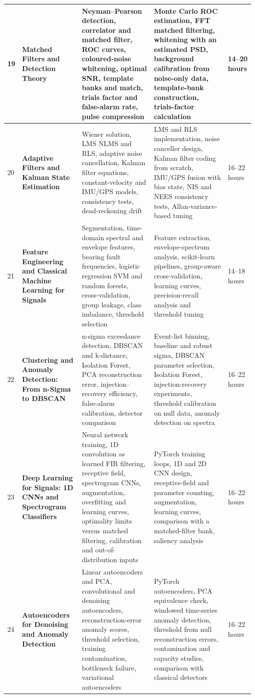 \documentclass[11pt,a4paper,landscape]{article}
\begin{document}
{\begin{longtable}{@{}p{0.6cm}p{3.7cm}p{8.2cm}p{7.6cm}p{2.0cm}@{}}
19 & \textbf{Matched Filters and Detection Theory} & Neyman--Pearson detection, correlator and matched filter, ROC curves, coloured-noise whitening, optimal SNR, template banks and match, trials factor and false-alarm rate, pulse compression & Monte Carlo ROC estimation, FFT matched filtering, whitening with an estimated PSD, background calibration from noise-only data, template-bank construction, trials-factor calculation & 14--20 hours\\\midrule
20 & \textbf{Adaptive Filters and Kalman State Estimation} & Wiener solution, LMS NLMS and RLS, adaptive noise cancellation, Kalman filter equations, constant-velocity and IMU/GPS models, consistency tests, dead-reckoning drift & LMS and RLS implementation, noise canceller design, Kalman filter coding from scratch, IMU/GPS fusion with bias state, NIS and NEES consistency tests, Allan-variance-based tuning & 16--22 hours\\\midrule
21 & \textbf{Feature Engineering and Classical Machine Learning for Signals} & Segmentation, time-domain spectral and envelope features, bearing fault frequencies, logistic regression SVM and random forests, cross-validation, group leakage, class imbalance, threshold selection & Feature extraction, envelope-spectrum analysis, scikit-learn pipelines, group-aware cross-validation, learning curves, precision-recall analysis and threshold tuning & 14--18 hours\\\midrule
22 & \textbf{Clustering and Anomaly Detection: From n-Sigma to DBSCAN} & n-sigma exceedance detection, DBSCAN and k-distance, Isolation Forest, PCA reconstruction error, injection--recovery efficiency, false-alarm calibration, detector comparison & Event-list binning, baseline and robust sigma, DBSCAN parameter selection, Isolation Forest, injection-recovery experiments, threshold calibration on null data, anomaly detection on spectra & 16--22 hours\\\midrule
23 & \textbf{Deep Learning for Signals: 1D CNNs and Spectrogram Classifiers} & Neural network training, 1D convolution as learned FIR filtering, receptive field, spectrogram CNNs, augmentation, overfitting and learning curves, optimality limits versus matched filtering, calibration and out-of-distribution inputs & PyTorch training loops, 1D and 2D CNN design, receptive-field and parameter counting, augmentation, learning curves, comparison with a matched-filter bank, saliency analysis & 16--22 hours\\\midrule
24 & \textbf{Autoencoders for Denoising and Anomaly Detection} & Linear autoencoders and PCA, convolutional and denoising autoencoders, reconstruction-error anomaly scores, threshold selection, training contamination, bottleneck failure, variational autoencoders & PyTorch autoencoders, PCA equivalence check, windowed time-series anomaly detection, threshold from null reconstruction errors, contamination and capacity studies, comparison with classical detectors & 16--22 hours\\\midrule

\end{longtable}}
\end{document}
